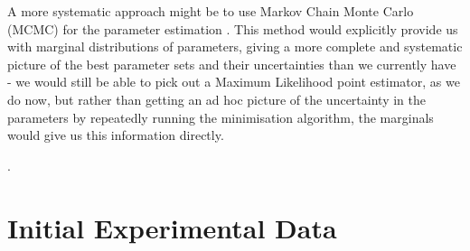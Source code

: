 \documentclass[10pt,journal]{./IEEE_latex_class/IEEEtran}
\begin{document}
A more systematic approach might be to use Markov Chain Monte Carlo (MCMC) for the parameter estimation \cite{Jitjareonchai2006,Andrieu2003}. This method would explicitly provide us with marginal distributions of parameters, giving a more complete and systematic picture of the best parameter sets and their uncertainties than we currently have - we would still be able to pick out a Maximum Likelihood point estimator, as we do now, but rather than getting an ad hoc picture of the uncertainty in the parameters by repeatedly running the minimisation algorithm, the marginals would give us this information directly.

.

\begin{footnotesize}


\end{footnotesize}
\clearpage
\onecolumn

\appendices
\renewcommand\thefigure{\thesection.\arabic{figure}}  


\section{Initial Experimental Data}
\label{Initial Experimental Data}
\setcounter{figure}{0}    
\end{document}
